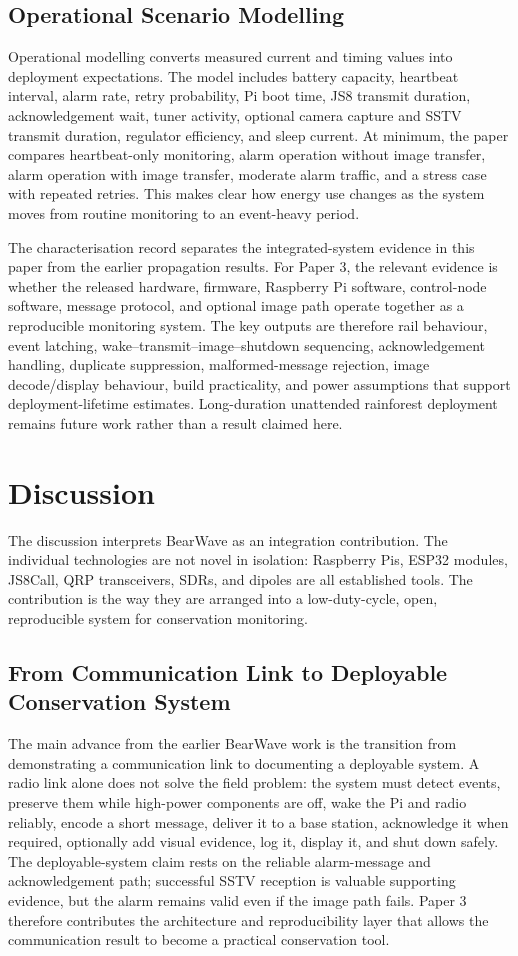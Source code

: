 \documentclass[acmsmall,screen]{acmart}
\begin{document}
\subsection{Operational Scenario Modelling}
Operational modelling converts measured current and timing values into deployment expectations. The model includes battery capacity, heartbeat interval, alarm rate, retry probability, Pi boot time, JS8 transmit duration, acknowledgement wait, tuner activity, optional camera capture and SSTV transmit duration, regulator efficiency, and sleep current. At minimum, the paper compares heartbeat-only monitoring, alarm operation without image transfer, alarm operation with image transfer, moderate alarm traffic, and a stress case with repeated retries. This makes clear how energy use changes as the system moves from routine monitoring to an event-heavy period.

The characterisation record separates the integrated-system evidence in this paper from the earlier propagation results. For Paper 3, the relevant evidence is whether the released hardware, firmware, Raspberry Pi software, control-node software, message protocol, and optional image path operate together as a reproducible monitoring system. The key outputs are therefore rail behaviour, event latching, wake--transmit--image--shutdown sequencing, acknowledgement handling, duplicate suppression, malformed-message rejection, image decode/display behaviour, build practicality, and power assumptions that support deployment-lifetime estimates. Long-duration unattended rainforest deployment remains future work rather than a result claimed here.

\section{Discussion}
The discussion interprets BearWave as an integration contribution. The individual technologies are not novel in isolation: Raspberry Pis, ESP32 modules, JS8Call, QRP transceivers, SDRs, and dipoles are all established tools. The contribution is the way they are arranged into a low-duty-cycle, open, reproducible system for conservation monitoring.

\subsection{From Communication Link to Deployable Conservation System}
The main advance from the earlier BearWave work is the transition from demonstrating a communication link to documenting a deployable system. A radio link alone does not solve the field problem: the system must detect events, preserve them while high-power components are off, wake the Pi and radio reliably, encode a short message, deliver it to a base station, acknowledge it when required, optionally add visual evidence, log it, display it, and shut down safely. The deployable-system claim rests on the reliable alarm-message and acknowledgement path; successful SSTV reception is valuable supporting evidence, but the alarm remains valid even if the image path fails. Paper 3 therefore contributes the architecture and reproducibility layer that allows the communication result to become a practical conservation tool.
\end{document}
